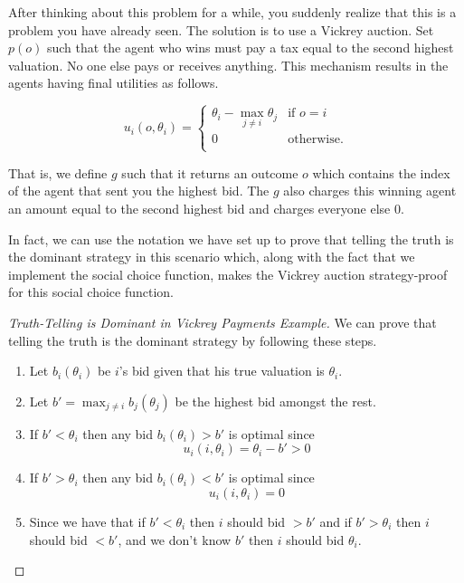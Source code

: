 After thinking about this problem for a while, you suddenly realize
that this is a problem you have already seen. The solution is to use a
Vickrey auction.  Set $p(o)$ such that the agent who wins must pay a
tax equal to the second highest valuation. No one else pays or
receives anything. This mechanism results in the agents having final
utilities as follows.

\[u_i(o,\theta_i)= \left\{
  \begin{array}{rl}
    \theta_i - \max_{j\neq i} \theta_j & \text{if } o = i \\
    0  & \text{otherwise.}\\
  \end{array}  \right.\]


That is, we define $g$ such that it returns an outcome $o$ which
contains the index of the agent that sent you the highest bid.  The
$g$ also charges this winning agent an amount equal to the second
highest bid and charges everyone else 0.

In fact, we can use the notation we have set up to prove that telling
the truth is the dominant strategy in this scenario which, along with
the fact that we implement the social choice function, makes the
Vickrey auction strategy-proof for this social choice function.

\begin{proof}[Truth-Telling is Dominant in Vickrey Payments Example]

  We can prove that telling the truth is the dominant strategy by
  following these steps.

  \begin{enumerate}
  \item Let $b_i(\theta_i)$ be $i$'s bid given that his true valuation
    is $\theta_i$.

  \item Let $b' = \max_{j \neq i} b_j(\theta_j)$ be the highest bid
    amongst the rest.

  \item If $b' < \theta_i$ then any bid $b_i(\theta_i) > b'$ is
    optimal since
    \[
    u_i(i,\theta_i) = \theta_i - b' > 0
    \] 

  \item If $b' > \theta_i$ then any bid $b_i(\theta_i) < b'$ is
    optimal since
    \[
    u_i(i,\theta_i) = 0
    \]
  \item Since we have that if $b' < \theta_i$ then $i$ should bid $>
    b'$ and if $b' > \theta_i$ then $i$ should bid $< b'$, and we
    don't know $b'$ then $i$ should bid $\theta_i$.
  \end{enumerate}
\end{proof}


